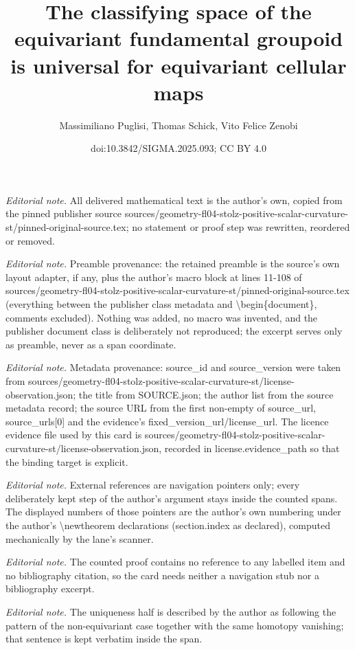 \documentclass[10pt,a4paper]{amsart}
\title{The classifying space of the equivariant fundamental groupoid is universal for equivariant cellular maps}
\author{Massimiliano Puglisi, Thomas Schick, Vito Felice Zenobi}
\date{doi:10.3842/SIGMA.2025.093; CC BY 4.0}
\begin{document}
\maketitle
\noindent\textit{Editorial note.} All delivered mathematical text is the author's own, copied from the pinned publisher source sources/geometry-fl04-stolz-positive-scalar-curvature-st/pinned-original-source.tex; no statement or proof step was rewritten, reordered or removed.\par\medskip
\noindent\textit{Editorial note.} Preamble provenance: the retained preamble is the source's own layout adapter, if any, plus the author's macro block at lines 11-108 of sources/geometry-fl04-stolz-positive-scalar-curvature-st/pinned-original-source.tex (everything between the publisher class metadata and \textbackslash{}begin\{document\}, comments excluded). Nothing was added, no macro was invented, and the publisher document class is deliberately not reproduced; the excerpt serves only as preamble, never as a span coordinate.\par\medskip
\noindent\textit{Editorial note.} Metadata provenance: source\_id and source\_version were taken from sources/geometry-fl04-stolz-positive-scalar-curvature-st/license-observation.json; the title from SOURCE.json; the author list from the source metadata record; the source URL from the first non-empty of source\_url, source\_urls[0] and the evidence's fixed\_version\_url/license\_url. The licence evidence file used by this card is sources/geometry-fl04-stolz-positive-scalar-curvature-st/license-observation.json, recorded in license.evidence\_path so that the binding target is explicit.\par\medskip
\noindent\textit{Editorial note.} External references are navigation pointers only; every deliberately kept step of the author's argument stays inside the counted spans. The displayed numbers of those pointers are the author's own numbering under the author's \textbackslash{}newtheorem declarations (section.index as declared), computed mechanically by the lane's scanner.\par\medskip
\noindent\textit{Editorial note.} The counted proof contains no reference to any labelled item and no bibliography citation, so the card needs neither a navigation stub nor a bibliography excerpt.\par\medskip
\noindent\textit{Editorial note.} The uniqueness half is described by the author as following the pattern of the non-equivariant case together with the same homotopy vanishing; that sentence is kept verbatim inside the span.\par\medskip
\end{document}
